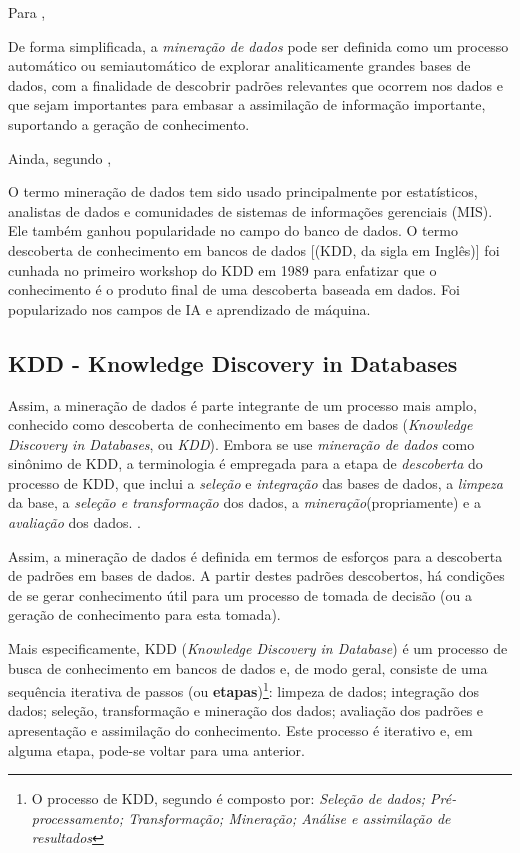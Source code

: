 Para ,
\begin{citacao}
	De forma simplificada, a \textit{mineração de dados }pode ser definida como um processo automático ou semiautomático de explorar analiticamente grandes bases de dados, com a finalidade de descobrir padrões relevantes que ocorrem nos dados e que sejam importantes para embasar a assimilação de informação importante, suportando a geração de conhecimento. 
\end{citacao}

Ainda, segundo , 
\begin{citacao}
	O termo mineração de dados tem sido usado principalmente por estatísticos, analistas de dados e comunidades de sistemas de informações gerenciais (MIS). Ele também ganhou popularidade no campo do banco de dados. O termo descoberta de conhecimento em bancos de dados [(KDD, da sigla em Inglês)] foi cunhada no primeiro workshop do KDD em 1989 para enfatizar que o conhecimento é o produto final de uma descoberta baseada em dados. Foi popularizado nos campos de IA e aprendizado de máquina.
\end{citacao}

\subsection{KDD - Knowledge Discovery in Databases}
Assim, a mineração de dados é parte integrante de um processo mais amplo, conhecido como descoberta de conhecimento em bases de dados (\textit{Knowledge Discovery in Databases}, ou \textit{KDD})\cite{fayyad1996}. Embora se use \textit{mineração de dados} como sinônimo de KDD, a terminologia é empregada para a etapa de \textit{descoberta}  do processo de KDD, que inclui a \textit{seleção} e \textit{integração} das bases de dados, a \textit{limpeza} da base, a \textit{seleção e transformação} dos dados, a \textit{mineração}(propriamente) e a \textit{avaliação} dos dados. \cite{ferrari2017}\cite{Boscarioli2017}.

Assim, a mineração de dados  é definida em termos de esforços para a descoberta de padrões em bases de dados. A partir destes padrões descobertos, há condições de se gerar conhecimento útil para um processo de tomada de decisão (ou a geração de conhecimento para esta tomada).

Mais especificamente, KDD (\textit{Knowledge Discovery in Database}) é um processo de busca de conhecimento em bancos de dados e, de modo geral, consiste de uma sequência iterativa de passos (ou \textbf{etapas})\footnote{O processo de KDD, segundo \cite{fayyad1996} é composto por: \textit{Seleção de dados; Pré-processamento; Transformação; Mineração; Análise e assimilação de resultados}}: limpeza de dados; integração dos dados; seleção, transformação e mineração dos dados; avaliação dos padrões e apresentação e assimilação do conhecimento. Este processo é iterativo e, em alguma etapa, pode-se voltar para uma anterior. \cite{Boscarioli2017}

